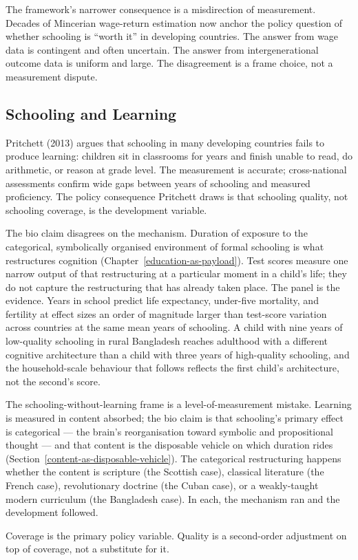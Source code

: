 \documentclass[12pt,letterpaper]{article}
\begin{document}
{The framework's narrower consequence is a misdirection of measurement. Decades of Mincerian wage-return estimation now anchor the policy question of whether schooling is ``worth it'' in developing countries. The answer from wage data is contingent and often uncertain. The answer from intergenerational outcome data is uniform and large. The disagreement is a frame choice, not a measurement dispute.

\subsection{Schooling and Learning}\label{schooling-and-learning}

Pritchett (2013) argues that schooling in many developing countries fails to produce learning: children sit in classrooms for years and finish unable to read, do arithmetic, or reason at grade level. The measurement is accurate; cross-national assessments confirm wide gaps between years of schooling and measured proficiency. The policy consequence Pritchett draws is that schooling quality, not schooling coverage, is the development variable.

The bio claim disagrees on the mechanism. Duration of exposure to the categorical, symbolically organised environment of formal schooling is what restructures cognition (Chapter~\ref{education-as-payload}). Test scores measure one narrow output of that restructuring at a particular moment in a child's life; they do not capture the restructuring that has already taken place. The panel is the evidence. Years in school predict life expectancy, under-five mortality, and fertility at effect sizes an order of magnitude larger than test-score variation across countries at the same mean years of schooling. A child with nine years of low-quality schooling in rural Bangladesh reaches adulthood with a different cognitive architecture than a child with three years of high-quality schooling, and the household-scale behaviour that follows reflects the first child's architecture, not the second's score.

The schooling-without-learning frame is a level-of-measurement mistake. Learning is measured in content absorbed; the bio claim is that schooling's primary effect is categorical --- the brain's reorganisation toward symbolic and propositional thought --- and that content is the disposable vehicle on which duration rides (Section~\ref{content-as-disposable-vehicle}). The categorical restructuring happens whether the content is scripture (the Scottish case), classical literature (the French case), revolutionary doctrine (the Cuban case), or a weakly-taught modern curriculum (the Bangladesh case). In each, the mechanism ran and the development followed.

Coverage is the primary policy variable. Quality is a second-order adjustment on top of coverage, not a substitute for it.

}
\end{document}
